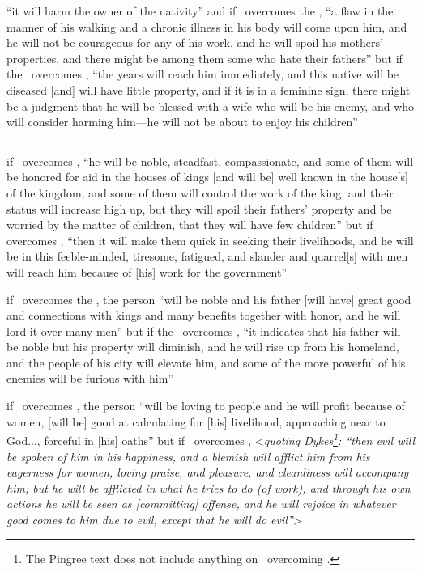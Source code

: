 \begin{description}[style=multiline,leftmargin=1.5cm]
\item[\Saturn\Square\Moon] ``it will harm the owner of the nativity'' and if \Saturn\, overcomes the \Moon, ``a flaw in the manner of his walking and a chronic illness in his body will come upon him, and he will not be courageous for any of his work, and he will spoil his mothers' properties, and there might be among them some who hate their fathers'' but if the \Moon\, overcomes \Saturn, ``the years will reach him immediately, and this native will be diseased [and] will have little property, and if it is in a feminine sign, there might be a judgment that he will be blessed with a wife who will be his enemy, and who will consider harming him---he will not be about to enjoy his children''

\vspace{0.5em}\hrule
\item[\Jupiter\Square\Mars] if \Jupiter\, overcomes \Mars, ``he will be noble, steadfast, compassionate, and some of them will be honored for aid in the houses of kings [and will be] well known in the house[s] of the kingdom, and some of them will control the work of the king, and their status will increase high up, but they will spoil their fathers' property and be worried by the matter of children, that they will have few children'' but if \Mars\, overcomes \Jupiter, ``then it will make them quick in seeking their livelihoods, and he will be in this feeble-minded, tiresome, fatigued, and slander and quarrel[s] with men will reach him because of [his] work for the government''

\item[\Jupiter\Square\Sun] if \Jupiter\, overcomes the \Sun, the person ``will be noble and his father [will have] great good and connections with kings and many benefits together with honor, and he will lord it over many men'' but if the \Sun\, overcomes \Jupiter, ``it indicates that his father will be noble but his property will diminish, and he will rise up from his homeland, and the people of his city will elevate him, and some of the more powerful of his enemies will be furious with him''

\item[\Jupiter\Square\Venus] if \Jupiter\, overcomes \Venus, the person ``will be loving to people and he will profit because of women, [will be] good at calculating for [his] livelihood, approaching near to God..., forceful in [his] oaths'' but if \Venus\, overcomes \Jupiter, <\textsl{quoting Dykes\footnote{The Pingree text does not include anything on \Venus\, overcoming \Jupiter.}: ``then evil will be spoken of him in his happiness, and a blemish will afflict him from his eagerness for women, loving praise, and pleasure, and cleanliness will accompany him; but he will be afflicted in what he tries to do (of work), and through his own actions he will be seen as [committing] offense, and he will rejoice in whatever good comes to him due to evil, except that he will do evil''}>


\end{description}
